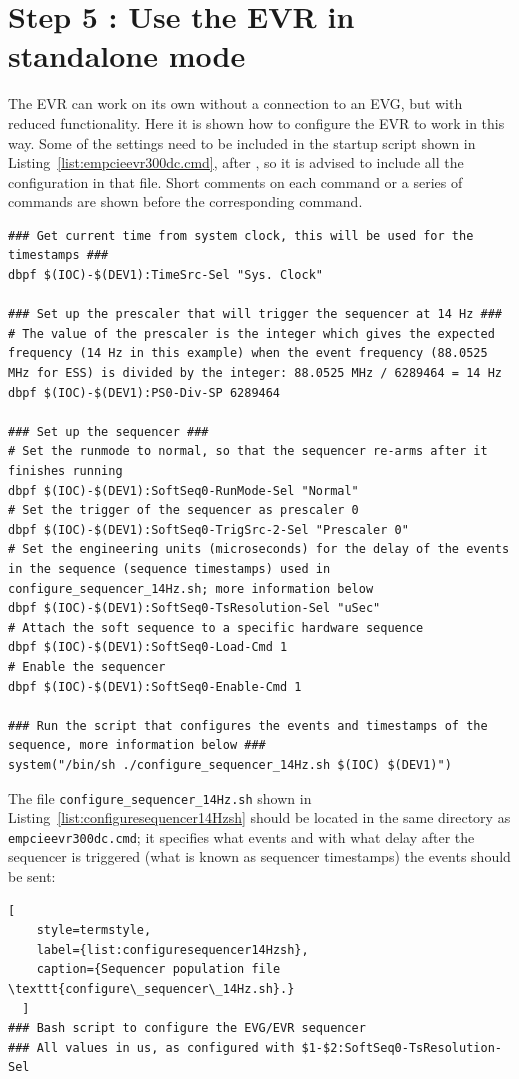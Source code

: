 \documentclass[11pt
  , a4paper
  , article
  , oneside
  , showtrims
]{memoir}
\begin{document}
{\section{Step 5 : Use the EVR in standalone mode}
The EVR can work on its own without a connection to an EVG, but with reduced functionality. Here it is shown how to configure the EVR to work in this way. Some of the settings need to be included in the startup script shown in Listing~\ref{list:empcieevr300dc.cmd}, after , so it is advised to include all the configuration in that file. Short comments on each command or a series of commands are shown before the corresponding command.
\begin{lstlisting}[style=termstyle]
### Get current time from system clock, this will be used for the timestamps ###
dbpf $(IOC)-$(DEV1):TimeSrc-Sel "Sys. Clock"

### Set up the prescaler that will trigger the sequencer at 14 Hz ###
# The value of the prescaler is the integer which gives the expected frequency (14 Hz in this example) when the event frequency (88.0525 MHz for ESS) is divided by the integer: 88.0525 MHz / 6289464 = 14 Hz
dbpf $(IOC)-$(DEV1):PS0-Div-SP 6289464

### Set up the sequencer ###
# Set the runmode to normal, so that the sequencer re-arms after it finishes running
dbpf $(IOC)-$(DEV1):SoftSeq0-RunMode-Sel "Normal"
# Set the trigger of the sequencer as prescaler 0
dbpf $(IOC)-$(DEV1):SoftSeq0-TrigSrc-2-Sel "Prescaler 0"
# Set the engineering units (microseconds) for the delay of the events in the sequence (sequence timestamps) used in configure_sequencer_14Hz.sh; more information below
dbpf $(IOC)-$(DEV1):SoftSeq0-TsResolution-Sel "uSec"
# Attach the soft sequence to a specific hardware sequence
dbpf $(IOC)-$(DEV1):SoftSeq0-Load-Cmd 1
# Enable the sequencer
dbpf $(IOC)-$(DEV1):SoftSeq0-Enable-Cmd 1

### Run the script that configures the events and timestamps of the sequence, more information below ###
system("/bin/sh ./configure_sequencer_14Hz.sh $(IOC) $(DEV1)")
\end{lstlisting}

The file \texttt{configure\_sequencer\_14Hz.sh} shown in Listing~\ref{list:configuresequencer14Hzsh} should be located in the same directory as \texttt{empcieevr300dc.cmd}; it specifies what events and with what delay after the sequencer is triggered (what is known as sequencer timestamps) the events should be sent:
\begin{lstlisting}[
    style=termstyle,
    label={list:configuresequencer14Hzsh},
    caption={Sequencer population file \texttt{configure\_sequencer\_14Hz.sh}.}
  ]
### Bash script to configure the EVG/EVR sequencer
### All values in us, as configured with $1-$2:SoftSeq0-TsResolution-Sel


\end{lstlisting}}
\end{document}
